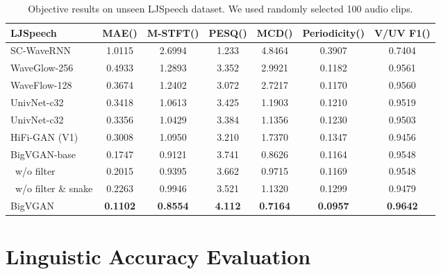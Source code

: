 \documentclass{article} \usepackage{iclr2023_conference,times}
\theoremstyle{plain}
\theoremstyle{definition}
\theoremstyle{remark}
\begin{document}
\begin{table*}[t]
\caption{\footnotesize
Objective results on unseen LJSpeech dataset. We used randomly selected 100 audio clips. 
}
\label{ljspeech}
\vspace{-0.05cm}
\begin{center}
\begin{small}
\begin{adjustbox}{width=0.9\textwidth}
\begin{tabular}{l|cccccc}
\toprule
LJSpeech  & MAE() & M-STFT() & PESQ() & MCD() & Periodicity() & V/UV F1()\\
\midrule
SC-WaveRNN & 1.0115 & 2.6994 & 1.233 & 4.8464 & 0.3907 & 0.7404 \\
WaveGlow-256 & 0.4933 & 1.2893 & 3.352 & 2.9921 & 0.1182 & 0.9561 \\
WaveFlow-128 & 0.3674 & 1.2402 & 3.072 & 2.7217 & 0.1170 & 0.9560 \\
UnivNet-c32 & 0.3418 & 1.0613 & 3.425 & 1.1903 & 0.1210 & 0.9519 \\
UnivNet-c32 & 0.3356 & 1.0429 & 3.384 & 1.1356 & 0.1230 & 0.9503 \\
HiFi-GAN (V1)   & 0.3008 & 1.0950 & 3.210 & 1.7370 & 0.1347 & 0.9456  \\
\midrule
BigVGAN-base    & 0.1747 & 0.9121 & 3.741 & 0.8626 & 0.1164 & 0.9548 \\
\ w/o filter    & 0.2015 & 0.9395 & 3.662 & 0.9715 & 0.1169 & 0.9548 \\
\ w/o filter \& snake    & 0.2263 & 0.9946 & 3.521 & 1.1320 & 0.1299 & 0.9479 \\
\midrule
BigVGAN    & \textbf{0.1102} & \textbf{0.8554} & \textbf{4.112} & \textbf{0.7164} & \textbf{0.0957} & \textbf{0.9642} \\
\bottomrule
\end{tabular}
\end{adjustbox}
\end{small}
\end{center}
\vskip -0.1in
\end{table*}


\clearpage
\newpage

\section{Linguistic Accuracy Evaluation}
\label{appendix:asr}
\end{document}
